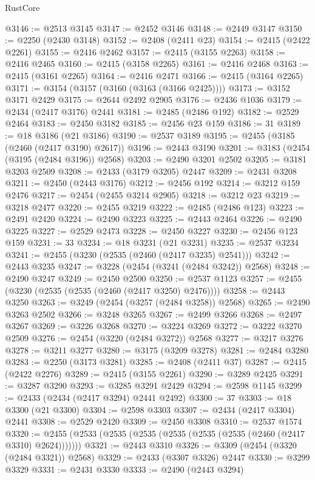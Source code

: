 \begin{lexlean}{RustCore}
\begin{coremodule}
@3146 := @2513 @3145
@3147 := @2452 @3146
@3148 := @2449 @3147
@3150 := @2250 (@2430 @3148)
@3152 := @2408 (@2411 @23)
@3154 := @2415 (@2422 @2261)
@3155 := @2416 @2462
@3157 := @2415 (@3155 @2263)
@3158 := @2416 @2465
@3160 := @2415 (@3158 @2265)
@3161 := @2416 @2468
@3163 := @2415 (@3161 @2265)
@3164 := @2416 @2471
@3166 := @2415 (@3164 @2265)
@3171 := @3154 (@3157 (@3160 (@3163 (@3166 @2425))))
@3173 := @3152 @3171 @2429
@3175 := @2644 @2492 @2905
@3176 := @2436 @1036
@3179 := @2434 (@2417 @3176) @2441
@3181 := @2485 (@2486 @192)
@3182 := @2529 @2464
@3183 := @2450 @3182
@3185 := @2456 @23 @159
@3186 := 31
@3189 := @18 @3186 (@21 @3186)
@3190 := @2537 @3189
@3195 := @2455 (@3185 (@2460 (@2417 @3190) @2617))
@3196 := @2443 @3190
@3201 := @3183 (@2454 (@3195 (@2484 @3196)) @2568)
@3203 := @2490 @3201 @2502
@3205 := @3181 @3203 @2509
@3208 := @2433 (@3179 @3205) @2447
@3209 := @2431 @3208
@3211 := @2450 (@2443 @3176)
@3212 := @2456 @192
@3214 := @3212 @159 @2476
@3217 := @2454 (@2455 @3214 @2905)
@3218 := @3212 @23
@3219 := @3218 @2477
@3220 := @2455 @3219
@3222 := @2485 (@2486 @123)
@3223 := @2491 @2420
@3224 := @2490 @3223
@3225 := @2443 @2464
@3226 := @2490 @3225
@3227 := @2529 @2473
@3228 := @2450 @3227
@3230 := @2456 @123 @159
@3231 := 33
@3234 := @18 @3231 (@21 @3231)
@3235 := @2537 @3234
@3241 := @2455 (@3230 (@2535 (@2460 (@2417 @3235) @2541)))
@3242 := @2443 @3235
@3247 := @3228 (@2454 (@3241 (@2484 @3242)) @2568)
@3248 := @2490 @3247
@3249 := @2450 @2500
@3250 := @2537 @1123
@3257 := @2455 (@3230 (@2535 (@2535 (@2460 (@2417 @3250) @2476))))
@3258 := @2443 @3250
@3263 := @3249 (@2454 (@3257 (@2484 @3258)) @2568)
@3265 := @2490 @3263 @2502
@3266 := @3248 @3265
@3267 := @2499 @3266
@3268 := @2497 @3267
@3269 := @3226 @3268
@3270 := @3224 @3269
@3272 := @3222 @3270 @2509
@3276 := @2454 (@3220 (@2484 @3272)) @2568
@3277 := @3217 @3276
@3278 := @3211 @3277
@3280 := @3175 (@3209 @3278)
@3281 := @2484 @3280
@3283 := @2250 (@3173 @3281)
@3285 := @2408 (@2411 @37)
@3287 := @2415 (@2422 @2276)
@3289 := @2415 (@3155 @2261)
@3290 := @3289 @2425
@3291 := @3287 @3290
@3293 := @3285 @3291 @2429
@3294 := @2598 @1145
@3299 := @2433 (@2434 (@2417 @3294) @2441 @2492)
@3300 := 37
@3303 := @18 @3300 (@21 @3300)
@3304 := @2598 @3303
@3307 := @2434 (@2417 @3304) @2441
@3308 := @2529 @2420
@3309 := @2450 @3308
@3310 := @2537 @1574
@3320 := @2455 (@2533 (@2535 (@2535 (@2535 (@2535 (@2535 (@2460 (@2417 @3310) @2624)))))))
@3321 := @2443 @3310
@3326 := @3309 (@2454 (@3320 (@2484 @3321)) @2568)
@3329 := @2433 (@3307 @3326) @2447
@3330 := @3299 @3329
@3331 := @2431 @3330
@3333 := @2490 (@2443 @3294)

\end{coremodule}
\end{lexlean}
